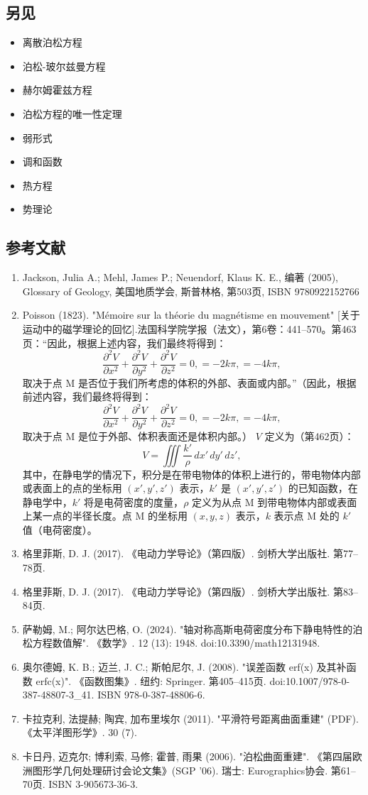 \subsection{另见}  
\begin{itemize}
\item 离散泊松方程  
\item 泊松-玻尔兹曼方程  
\item 赫尔姆霍兹方程  
\item 泊松方程的唯一性定理  
\item 弱形式  
\item 调和函数  
\item 热方程  
\item 势理论
\end{itemize}
\subsection{参考文献}  
\begin{enumerate}
\item Jackson, Julia A.; Mehl, James P.; Neuendorf, Klaus K. E., 编著 (2005), Glossary of Geology, 美国地质学会, 斯普林格, 第503页, ISBN 9780922152766  
\item Poisson (1823). "Mémoire sur la théorie du magnétisme en mouvement" [关于运动中的磁学理论的回忆].法国科学院学报（法文），第6卷：441–570。第463页：“因此，根据上述内容，我们最终将得到：  
\[
\frac{\partial^2 V}{\partial x^2} + \frac{\partial^2 V}{\partial y^2} + \frac{\partial^2 V}{\partial z^2} = 0, = -2k\pi, = -4k\pi,~
\]
取决于点 M 是否位于我们所考虑的体积的外部、表面或内部。”（因此，根据前述内容，我们最终将得到：  
\[
\frac{\partial^2 V}{\partial x^2} + \frac{\partial^2 V}{\partial y^2} + \frac{\partial^2 V}{\partial z^2} = 0, = -2k\pi, = -4k\pi,~
\]
取决于点 M 是位于外部、体积表面还是体积内部。）  
\(V\) 定义为（第462页）：  
\[
V = \iiint \frac{k'}{\rho} \, dx' \, dy' \, dz',~
\]
其中，在静电学的情况下，积分是在带电物体的体积上进行的，带电物体内部或表面上的点的坐标用 \((x', y', z')\) 表示，\(k'\) 是 \( (x', y', z') \) 的已知函数，在静电学中，\(k'\) 将是电荷密度的度量，\(\rho\) 定义为从点 M 到带电物体内部或表面上某一点的半径长度。点 M 的坐标用 \((x, y, z)\) 表示，\(k\) 表示点 M 处的 \(k'\) 值（电荷密度）。
\item 格里菲斯, D. J. (2017). 《电动力学导论》（第四版）. 剑桥大学出版社. 第77–78页.  
\item 格里菲斯, D. J. (2017). 《电动力学导论》（第四版）. 剑桥大学出版社. 第83–84页.  
\item 萨勒姆, M.; 阿尔达巴格, O. (2024). "轴对称高斯电荷密度分布下静电特性的泊松方程数值解". 《数学》. 12 (13): 1948. doi:10.3390/math12131948.  
\item 奥尔德姆, K. B.; 迈兰, J. C.; 斯帕尼尔, J. (2008). "误差函数 erf(x) 及其补函数 erfc(x)". 《函数图集》. 纽约: Springer. 第405–415页. doi:10.1007/978-0-387-48807-3_41. ISBN 978-0-387-48806-6.  
\item 卡拉克利, 法提赫; 陶宾, 加布里埃尔 (2011). "平滑符号距离曲面重建" (PDF). 《太平洋图形学》. 30 (7).  
\item 卡日丹, 迈克尔; 博利索, 马修; 霍普, 雨果 (2006). "泊松曲面重建". 《第四届欧洲图形学几何处理研讨会论文集》(SGP '06). 瑞士: Eurographics协会. 第61–70页. ISBN 3-905673-36-3.
\end{enumerate}
